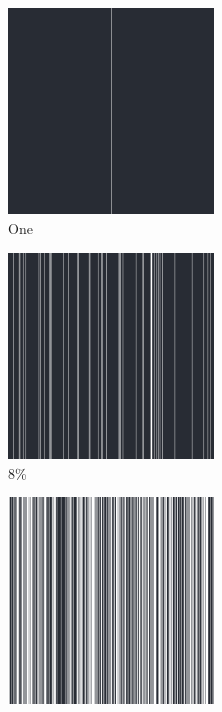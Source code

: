 \documentclass[12pt, fleqn]{report}                             %
\theoremstyle{break}                                            %
\begin{document}
      \begin{figure}[ht!]
        \centering
        \begin{subfigure}[b]{0.4\linewidth}
          \includegraphics[width=0.6\textwidth]{Images/204/a.png}
          \caption{One}
        \end{subfigure}
        \begin{subfigure}[b]{0.4\linewidth}
          \includegraphics[width=0.6\textwidth]{Images/204/b.png}
          \caption{8\%}
        \end{subfigure}
        \begin{subfigure}[b]{0.4\linewidth}
          \includegraphics[width=0.6\textwidth]{Images/204/c.png}

\end{subfigure}
\end{figure}
\end{document}
